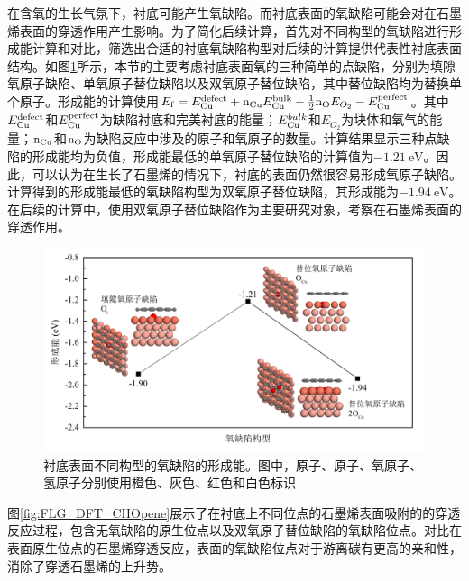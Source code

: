 在含氧的生长气氛下，衬底可能产生氧缺陷。而衬底表面的氧缺陷可能会对在石墨烯表面的穿透作用产生影响。为了简化后续计算，首先对不同构型的氧缺陷进行形成能计算和对比，筛选出合适的衬底氧缺陷构型对后续的计算提供代表性衬底表面结构。如图\ref{fig:FLG_DFT_Odefect}所示，本节的主要考虑衬底表面氧的三种简单的点缺陷，分别为\chinesecolon 填隙氧原子缺陷、单氧原子替位缺陷以及双氧原子替位缺陷，其中替位缺陷均为替换单个原子。形成能的计算使用$E_{\rm f}=E_{\rm Cu}^{\rm defect}+{\rm n_{Cu}}E_{\rm Cu}^{\rm bulk}-\frac{1}{2}{\rm n_{O}}E_{O_{2}} - E_{\rm Cu}^{\rm perfect}$。其中$E_{\rm Cu}^{\rm defect}$和$E_{\rm Cu}^{\rm perfect}$为缺陷衬底和完美衬底的能量；$E_{\rm Cu}^{bulk}$和$E_{O_{2}}$为块体和氧气的能量；${\rm n_{Cu}}$和${\rm n_{O}}$为缺陷反应中涉及的原子和氧原子的数量。计算结果显示三种点缺陷的形成能均为负值，形成能最低的单氧原子替位缺陷的计算值为$\SI{-1.21}{\electronvolt}$。因此，可以认为在生长了石墨烯的情况下，衬底的表面仍然很容易形成氧原子缺陷。计算得到的形成能最低的氧缺陷构型为双氧原子替位缺陷，其形成能为$\SI{-1.94}{\electronvolt}$。在后续的计算中，使用双氧原子替位缺陷作为主要研究对象，考察在石墨烯表面的穿透作用。


\begin{figure}[htb]
    \includegraphics{pic/FLG_DFT_Odefect.png}
    \caption{衬底表面不同构型的氧缺陷的形成能。图中，原子、原子、氧原子、氢原子分别使用橙色、灰色、红色和白色标识}
    \label{fig:FLG_DFT_Odefect}
\end{figure}

图\ref{fig:FLG_DFT_CHOpene}展示了在衬底上不同位点的石墨烯表面吸附的的穿透反应过程，包含无氧缺陷的原生位点以及双氧原子替位缺陷的氧缺陷位点。对比在表面原生位点的石墨烯穿透反应，表面的氧缺陷位点对于游离碳有更高的亲和性，消除了穿透石墨烯的上升势。


